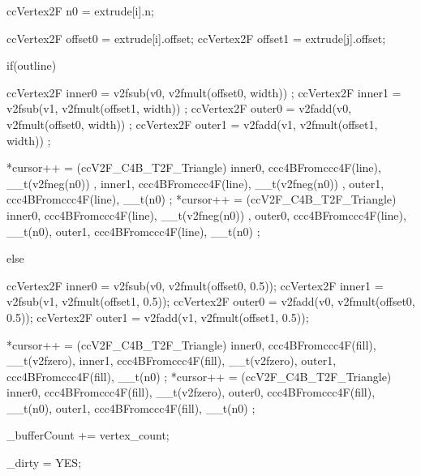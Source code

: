 \begin{DoxyCode}
{{                ccVertex2F n0 = extrude[i].n;
                
                ccVertex2F offset0 = extrude[i].offset;
                ccVertex2F offset1 = extrude[j].offset;
                
                if(outline){
                        ccVertex2F inner0 = v2fsub(v0, v2fmult(offset0, width))
      ;
                        ccVertex2F inner1 = v2fsub(v1, v2fmult(offset1, width))
      ;
                        ccVertex2F outer0 = v2fadd(v0, v2fmult(offset0, width))
      ;
                        ccVertex2F outer1 = v2fadd(v1, v2fmult(offset1, width))
      ;
                        
                        *cursor++ = (ccV2F_C4B_T2F_Triangle){
                                {inner0, ccc4BFromccc4F(line), __t(v2fneg(n0))}
      ,
                                {inner1, ccc4BFromccc4F(line), __t(v2fneg(n0))}
      ,
                                {outer1, ccc4BFromccc4F(line), __t(n0)}
                        };
                        *cursor++ = (ccV2F_C4B_T2F_Triangle){
                                {inner0, ccc4BFromccc4F(line), __t(v2fneg(n0))}
      ,
                                {outer0, ccc4BFromccc4F(line), __t(n0)},
                                {outer1, ccc4BFromccc4F(line), __t(n0)}
                        };
                } else {
                        ccVertex2F inner0 = v2fsub(v0, v2fmult(offset0, 0.5));
                        ccVertex2F inner1 = v2fsub(v1, v2fmult(offset1, 0.5));
                        ccVertex2F outer0 = v2fadd(v0, v2fmult(offset0, 0.5));
                        ccVertex2F outer1 = v2fadd(v1, v2fmult(offset1, 0.5));
                        
                        *cursor++ = (ccV2F_C4B_T2F_Triangle){
                                {inner0, ccc4BFromccc4F(fill), __t(v2fzero)}, 
                                {inner1, ccc4BFromccc4F(fill), __t(v2fzero)},
                                {outer1, ccc4BFromccc4F(fill), __t(n0)}
                        };
                        *cursor++ = (ccV2F_C4B_T2F_Triangle){
                                {inner0, ccc4BFromccc4F(fill), __t(v2fzero)},
                                {outer0, ccc4BFromccc4F(fill), __t(n0)},
                                {outer1, ccc4BFromccc4F(fill), __t(n0)}
                        };
                }
        }
        
        _bufferCount += vertex_count;
        
        _dirty = YES;
}
\end{DoxyCode}
